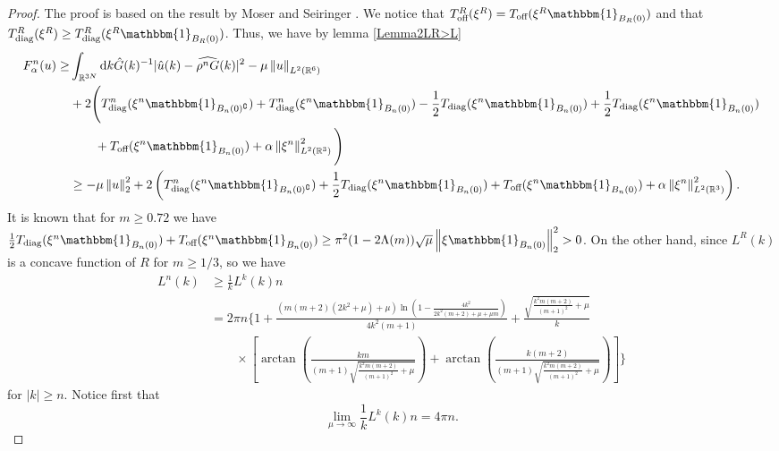\documentclass[a4paper,11pt]{article}
\newcommand{\norm}[1]{\left\lVert #1 \right\rVert}
\newcommand{\abs}[1]{\left\lvert #1 \right\rvert}
\newcommand*\diff{\mathop{}\!\mathrm{d}}
\newcommand{\R}{\mathbb{R}}
\numberwithin{equation}{section}
\begin{document}
	\begin{proof}
		The proof is based on the result by Moser and Seiringer \cite{Moser_2017}. We notice that $ T^R_{\text{off}}(\xi^R)=T_{\text{off}}(\xi^R\mathbbm{1}_{B_R(0)}) $ and that $ T^R_{\text{diag}}(\xi^R)\geq T^R_{\text{diag}}(\xi^R\mathbbm{1}_{B_R(0)}) $. Thus, we have by lemma \ref{Lemma2LR>L} \begin{equation}
		\begin{aligned}
		F^n_\alpha(u)\geq&\int_{\R^{3N}}\diff k \hat{G}(k)^{-1}|\hat{u}(k)-\widehat{\rho^n G}(k)|^2-\mu\norm{u}_{L^2(\R^{6})}\\&+2\Bigg(T^n_{\text{diag}}(\xi^n\mathbbm{1}_{B_n(0)^\complement})+T^n_{\text{diag}}(\xi^n\mathbbm{1}_{B_n(0)})-\frac{1}{2}T_{\text{diag}}(\xi^n\mathbbm{1}_{B_n(0)})+\frac{1}{2}T_{\text{diag}}(\xi^n\mathbbm{1}_{B_n(0)})\\&\qquad+T_{\text{off}}(\xi^n\mathbbm{1}_{B_n(0)})+\alpha\norm{\xi^n}_{L^2(\R^{3})}^2\Bigg)\\
		&\geq -\mu\norm{u}_2^2+2\left(T^n_{\text{diag}}(\xi^n\mathbbm{1}_{B_n(0)^\complement})+\frac{1}{2}T_{\text{diag}}(\xi^n\mathbbm{1}_{B_n(0)})+T_{\text{off}}(\xi^n\mathbbm{1}_{B_n(0)})+\alpha\norm{\xi^n}_{L^2(\R^{3})}^2\right).
		\end{aligned}
		\end{equation}
		It is known that for $ m\geq0.72 $ we have $ \frac{1}{2}T_{\text{diag}}(\xi^n\mathbbm{1}_{B_n(0)})+T_{\text{off}}(\xi^n\mathbbm{1}_{B_n(0)})\geq\pi^2(1-2\Lambda(m))\sqrt{\mu}\norm{\xi\mathbbm{1}_{B_n(0)}}_2^2>0 $. On the other hand, since $ L^R(k) $ is a concave function of $ R $ for $ m\geq1/3 $, so we have \begin{equation}\label{EqL^nIneq}
		\begin{aligned}
		L^n(k)&\geq \frac{1}{k}L^k(k)n\\&=2 \pi n  \Bigg\{1+\frac{\left(m (m+2) \left(2 k^2+\mu \right)+\mu \right) \ln \left(1-\frac{4 k^2}{2 k^2 (m+2)+\mu +\mu  m}\right)}{4 k^2 (m+1)}+\frac{\sqrt{\frac{k^2 m (m+2)}{(m+1)^2}+\mu }}{k}\\
		& \qquad\times\left[\arctan
		\left(\frac{k m}{(m+1) \sqrt{\frac{k^2 m (m+2)}{(m+1)^2}+\mu }}\right)+\arctan\left(\frac{k (m+2)}{(m+1) \sqrt{\frac{k^2 m (m+2)}{(m+1)^2}+\mu }}\right)\right]\Bigg\} 
		\end{aligned}
		\end{equation} 
		for $ \abs{k}\geq n $. Notice first that 
		\begin{equation}
		\lim\limits_{\mu\to\infty}\frac{1}{k}L^k(k)n=4\pi n.
		\end{equation}

\end{proof}
\end{document}
